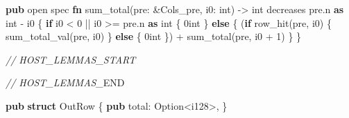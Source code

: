 \documentclass[
]{article}
\newenvironment{Shaded}{}{}
\newcommand{\CommentTok}[1]{\textcolor[rgb]{0.38,0.63,0.69}{\textit{#1}}}
\newcommand{\ControlFlowTok}[1]{\textcolor[rgb]{0.00,0.44,0.13}{\textbf{#1}}}
\newcommand{\DataTypeTok}[1]{\textcolor[rgb]{0.56,0.13,0.00}{#1}}
\newcommand{\DecValTok}[1]{\textcolor[rgb]{0.25,0.63,0.44}{#1}}
\newcommand{\KeywordTok}[1]{\textcolor[rgb]{0.00,0.44,0.13}{\textbf{#1}}}
\newcommand{\NormalTok}[1]{#1}
\newcommand{\OperatorTok}[1]{\textcolor[rgb]{0.40,0.40,0.40}{#1}}
\newcommand{\RegionMarkerTok}[1]{#1}
\begin{document}
\begin{Shaded}
\begin{Highlighting}[]
\KeywordTok{pub}\NormalTok{ open spec }\KeywordTok{fn}\NormalTok{ sum\_total(pre}\OperatorTok{:} \OperatorTok{\&}\NormalTok{Cols\_pre}\OperatorTok{,}\NormalTok{ i0}\OperatorTok{:}\NormalTok{ int) }\OperatorTok{{-}\textgreater{}}\NormalTok{ int}
\NormalTok{    decreases pre}\OperatorTok{.}\NormalTok{n }\KeywordTok{as}\NormalTok{ int }\OperatorTok{{-}}\NormalTok{ i0}
\OperatorTok{\{}
    \ControlFlowTok{if}\NormalTok{ i0 }\OperatorTok{\textless{}} \DecValTok{0} \OperatorTok{||}\NormalTok{ i0 }\OperatorTok{\textgreater{}=}\NormalTok{ pre}\OperatorTok{.}\NormalTok{n }\KeywordTok{as}\NormalTok{ int }\OperatorTok{\{}
\NormalTok{        0int}
    \OperatorTok{\}} \ControlFlowTok{else} \OperatorTok{\{}
\NormalTok{        (}\ControlFlowTok{if}\NormalTok{ row\_hit(pre}\OperatorTok{,}\NormalTok{ i0) }\OperatorTok{\{}\NormalTok{ sum\_total\_val(pre}\OperatorTok{,}\NormalTok{ i0) }\OperatorTok{\}} \ControlFlowTok{else} \OperatorTok{\{}\NormalTok{ 0int }\OperatorTok{\}}\NormalTok{) }\OperatorTok{+}\NormalTok{ sum\_total(pre}\OperatorTok{,}\NormalTok{ i0 }\OperatorTok{+} \DecValTok{1}\NormalTok{)}
    \OperatorTok{\}}
\OperatorTok{\}}

\CommentTok{// HOST\_LEMMAS\_START}

\CommentTok{// HOST\_LEMMAS\_}\RegionMarkerTok{END}

\KeywordTok{pub} \KeywordTok{struct}\NormalTok{ OutRow }\OperatorTok{\{}
    \KeywordTok{pub}\NormalTok{ total}\OperatorTok{:} \DataTypeTok{Option}\OperatorTok{\textless{}}\DataTypeTok{i128}\OperatorTok{\textgreater{},}
\OperatorTok{\}}


\end{Highlighting}
\end{Shaded}
\end{document}
